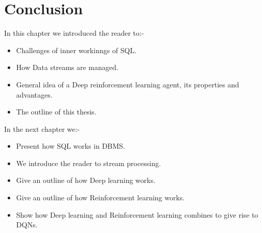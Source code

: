 \section{Conclusion}
\label{sec:Conclusion}
In this chapter we introduced the reader to:-
\begin{itemize}
    \item Challenges of inner workinngs of SQL. 
    \item How Data streams are managed.
    \item General idea of a Deep reinforcement learning agent, its properties and advantages.
    \item The outline of this thesis.
\end{itemize}
In the next chapter we:-
\begin{itemize}
    \item Present how SQL works in DBMS.
    \item We introduce the reader to stream processing.
    \item Give an outline of how Deep learning works.
    \item Give an outline of how Reinforcement learning works.
    \item Show how Deep learning and Reinforcement learning combines to give rise to DQNs.
\end{itemize}
